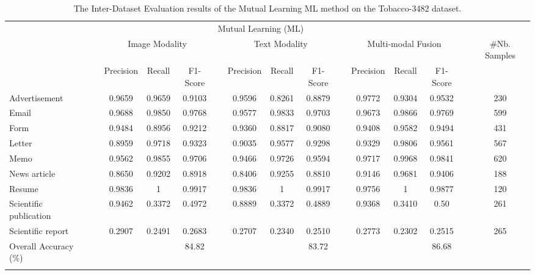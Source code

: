\documentclass[twocolumn]{svjour3}
\begin{document}
\setlength\tabcolsep{3.8 pt}
\begin{table*}[tbh]
\small
\centering
\caption{The Inter-Dataset Evaluation results of the Mutual Learning ML method on the Tobacco-3482 dataset.}
\resizebox{\textwidth}{!} {\begin{tabular}{lcccccccccccccc}
    \hline\noalign{\smallskip}
     \multicolumn{1}{c}{} && \multicolumn{10}{c}{Mutual Learning (ML)} \\
         \noalign{\smallskip}\hline\noalign{\smallskip}
         \multicolumn{1}{c}{Class Labels} && \multicolumn{3}{c}{Image Modality} && \multicolumn{3}{c}{Text Modality} && \multicolumn{3}{c}{Multi-modal Fusion} && \multicolumn{1}{c}{\#Nb. Samples}\\
         \noalign{\smallskip}\hline\noalign{\smallskip}
          && Precision & Recall & F1-Score &&  Precision & Recall & F1-Score && Precision & Recall & F1-Score &&  \\
         \cmidrule{3-13}Advertisement 
         && 0.9659 & 0.9659 & 0.9103
         && 0.9596 & 0.8261 & 0.8879 
         && 0.9772 & 0.9304 & 0.9532 
         && 230 \\
         Email 
         && 0.9688 & 0.9850 & 0.9768 
         && 0.9577 & 0.9833 & 0.9703
         && 0.9673 & 0.9866 & 0.9769 
         && 599 \\
         Form 
         && 0.9484 & 0.8956 & 0.9212 
         && 0.9360 & 0.8817 & 0.9080
         && 0.9408 & 0.9582 & 0.9494 
         && 431 \\
         Letter 
         && 0.8959 & 0.9718 & 0.9323
         && 0.9035 & 0.9577 & 0.9298 
         && 0.9329 & 0.9806 & 0.9561 
         && 567 \\
         Memo 
         && 0.9562 & 0.9855 & 0.9706
         && 0.9466 & 0.9726 & 0.9594
         && 0.9717 & 0.9968 & 0.9841 
         && 620 \\
         News article 
         && 0.8650 & 0.9202 & 0.8918
         && 0.8406 & 0.9255 & 0.8810
         && 0.9146 & 0.9681 & 0.9406 
         && 188 \\
         Resume 
         && 0.9836 & 1 & 0.9917
         && 0.9836 & 1 & 0.9917
         && 0.9756 & 1 & 0.9877 
         && 120 \\
         Scientific publication 
         && 0.9462 & 0.3372 & 0.4972
         && 0.8889 & 0.3372 & 0.4889
         && 0.9368 & 0.3410 & 0.50 
         && 261 \\
         Scientific report 
         && 0.2907 & 0.2491 & 0.2683 
         && 0.2707 & 0.2340 & 0.2510 
         && 0.2773 & 0.2302 & 0.2515 
         && 265 \\
    \noalign{\smallskip}\hline\noalign{\smallskip}
        Overall Accuracy (\%) && & & 84.82 &&  &  & 83.72 &&  &  & 86.68 \\
    \noalign{\smallskip}\hline
    
    \end{tabular}}
    \label{tab:Evaluation of PML on tobacco}
\end{table*}
\end{document}
